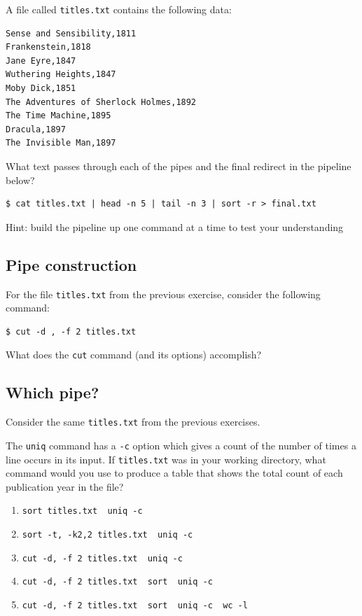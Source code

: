 \documentclass[
]{krantz}
\providecommand{\tightlist}{%
  \setlength{\itemsep}{0pt}\setlength{\parskip}{0pt}}
\begin{document}
A file called \texttt{titles.txt} contains the following data:

\begin{verbatim}
Sense and Sensibility,1811
Frankenstein,1818
Jane Eyre,1847
Wuthering Heights,1847
Moby Dick,1851
The Adventures of Sherlock Holmes,1892
The Time Machine,1895
Dracula,1897
The Invisible Man,1897
\end{verbatim}

What text passes through each of the pipes and the final redirect in the pipeline below?

\begin{verbatim}
$ cat titles.txt | head -n 5 | tail -n 3 | sort -r > final.txt
\end{verbatim}

Hint: build the pipeline up one command at a time to test your understanding

\hypertarget{bash-tools-ex-pipe-construction}{%
\subsection{Pipe construction}\label{bash-tools-ex-pipe-construction}}

For the file \texttt{titles.txt} from the previous exercise, consider the following command:

\begin{verbatim}
$ cut -d , -f 2 titles.txt
\end{verbatim}

What does the \texttt{cut} command (and its options) accomplish?

\hypertarget{bash-tools-ex-which-pipe}{%
\subsection{Which pipe?}\label{bash-tools-ex-which-pipe}}

Consider the same \texttt{titles.txt} from the previous exercises.

The \texttt{uniq} command has a \texttt{-c} option which gives a count of the
number of times a line occurs in its input.
If \texttt{titles.txt} was in your working directory,
what command would you use to produce
a table that shows the total count of each publication year in the file?

\begin{enumerate}
\def\labelenumi{\arabic{enumi}.}
\tightlist
\item
  \texttt{sort\ titles.txt\ \textbar{}\ uniq\ -c}
\item
  \texttt{sort\ -t,\ -k2,2\ titles.txt\ \textbar{}\ uniq\ -c}
\item
  \texttt{cut\ -d,\ -f\ 2\ titles.txt\ \textbar{}\ uniq\ -c}
\item
  \texttt{cut\ -d,\ -f\ 2\ titles.txt\ \textbar{}\ sort\ \textbar{}\ uniq\ -c}
\item
  \texttt{cut\ -d,\ -f\ 2\ titles.txt\ \textbar{}\ sort\ \textbar{}\ uniq\ -c\ \textbar{}\ wc\ -l}
\end{enumerate}
\end{document}
